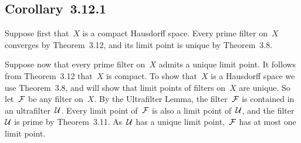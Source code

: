 \subsection{Corollary~3.12.1}

Suppose first that~$X$ is a compact Hausdorff space.
Every prime filter on~$X$ converges by Theorem~3.12, and its limit point is unique by Theorem~3.8.

Suppose now that every prime filter on~$X$ admits a unique limit point.
It follows from Theorem~3.12 that~$X$ is compact.
To show that~$X$ is a Hausdorff space we use Theorem~3.8, and will show that limit points of filters on~$X$ are unique.
So let~$\mathcal{F}$ be any filter on~$X$.
By the Ultrafilter Lemma, the filter~$\mathcal{F}$ is contained in an ultrafilter~$\mathcal{U}$.
Every limit point of~$\mathcal{F}$ is also a limit point of~$\mathcal{U}$, and the filter~$\mathcal{U}$ is prime by Theorem~3.11.
As~$\mathcal{U}$ has a unique limit point,~$\mathcal{F}$ has at most one limit point.

